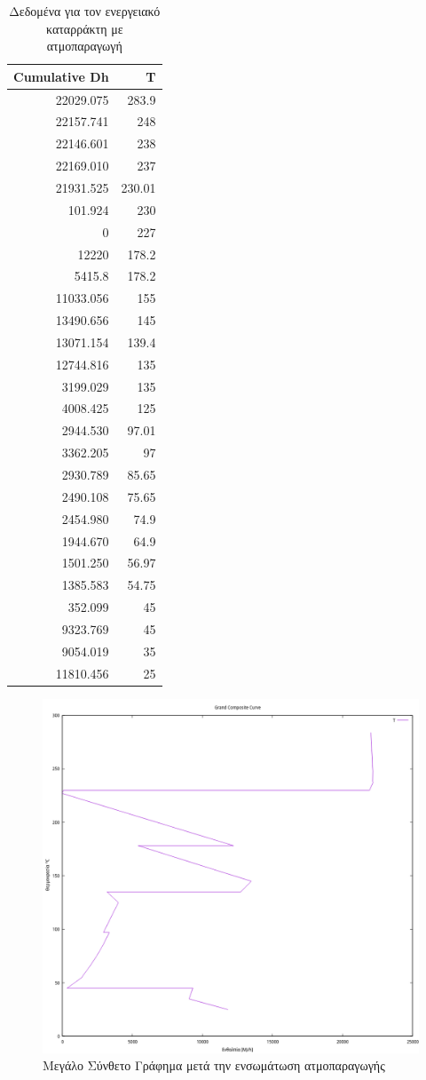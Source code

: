 \documentclass[11pt]{article}
\begin{document}
\begin{table}[htbp]
\caption{Δεδομένα για τον ενεργειακό καταρράκτη με ατμοπαραγωγή}
\centering
\begin{tabular}{rr}
Cumulative  Dh & T\\
\hline
22029.075 & 283.9\\
22157.741 & 248\\
22146.601 & 238\\
22169.010 & 237\\
21931.525 & 230.01\\
101.924 & 230\\
0 & 227\\
12220 & 178.2\\
5415.8 & 178.2\\
11033.056 & 155\\
13490.656 & 145\\
13071.154 & 139.4\\
12744.816 & 135\\
3199.029 & 135\\
4008.425 & 125\\
2944.530 & 97.01\\
3362.205 & 97\\
2930.789 & 85.65\\
2490.108 & 75.65\\
2454.980 & 74.9\\
1944.670 & 64.9\\
1501.250 & 56.97\\
1385.583 & 54.75\\
352.099 & 45\\
9323.769 & 45\\
9054.019 & 35\\
11810.456 & 25\\
\end{tabular}
\end{table}

\begin{figure}[htbp]
\centering
\includegraphics[width=.9\linewidth]{Diagrams/grand_composite_curve_3.png}
\caption{Μεγάλο Σύνθετο Γράφημα μετά την ενσωμάτωση ατμοπαραγωγής}
\end{figure}
\end{document}
